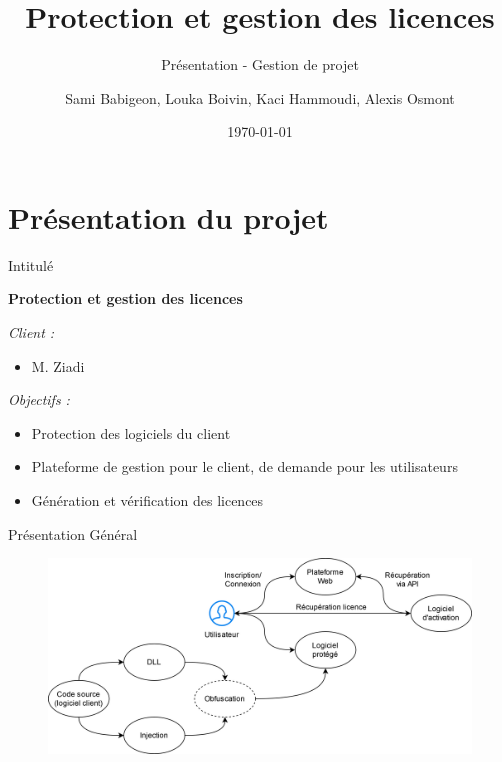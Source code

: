 \documentclass{cubeamer}
\title{Protection et gestion des licences}
\subtitle{Présentation - Gestion de projet}
\author{Sami Babigeon, Louka Boivin, Kaci Hammoudi, Alexis Osmont}
\date{\today}
\institute[Université de Rouen]{Master Informatique - 1ère année}
\begin{document}
\maketitle
\cutoc

%
%



\section{Présentation du projet}

\begin{frame}{Intitulé}
    \centerline{\textbf{Protection et gestion des licences}}
    \medskip
    \emph{Client :}
    \begin{itemize}
        \item M. Ziadi
    \end{itemize}
    \emph{Objectifs :}
    \begin{itemize}
        \item Protection des logiciels du client
        \item Plateforme de gestion pour le client, de demande pour les utilisateurs
        \item Génération et vérification des licences
    \end{itemize}
\end{frame}

\begin{frame}{Présentation Général}
    \begin{figure}
        \includegraphics[scale=0.8]{img/general.png}
    \end{figure}
\end{frame}
\end{document}
